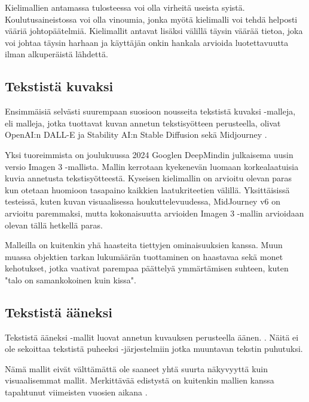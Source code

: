 Kielimallien antamassa tulosteessa voi olla virheitä useista syistä.
Koulutusaineistossa voi olla vinoumia, jonka myötä kielimalli voi tehdä
helposti vääriä johtopäätelmiä. Kielimallit antavat lisäksi välillä täysin
väärää tietoa, joka voi johtaa täysin harhaan ja käyttäjän onkin hankala
arvioida luotettavuutta ilman alkuperäistä lähdettä.
\parencite{akavaworksNakokulmiaTekoalyynOsa6}

\subsection{Tekstistä kuvaksi}

Ensimmäisiä selvästi suurempaan suosioon nousseita tekstistä kuvaksi -malleja,
eli malleja, jotka tuottavat kuvan annetun tekstisyötteen perusteella, olivat
OpenAI:n DALL-E \parencite{openAIDallE} ja Stability AI:n Stable Diffusion
\parencite{stableDiffusionLaunch} sekä Midjourney
\parencite{twitter1547108864788553729}.

Yksi tuoreimmista on joulukuussa 2024 Googlen DeepMindin julkaisema uusin
versio Imagen 3 -mallista. Mallin kerrotaan kyekenevän luomaan korkealaatuisia
kuvia annetusta tekstisyötteestä. Kyseisen kielimallin on arvioitu olevan paras
kun otetaan huomioon tasapaino kaikkien laatukriteetien välillä. Yksittäisissä
testeissä, kuten kuvan visuaalisessa houkuttelevuudessa, MidJourney v6 on
arvioitu paremmaksi, mutta kokonaisuutta arvioiden Imagen 3 -mallin arvioidaan
olevan tällä hetkellä paras. \parencite{googleDeepmindImagen3_v3report}

Malleilla on kuitenkin yhä haasteita tiettyjen ominaisuuksien kanssa. Muun
muassa objektien tarkan lukumäärän tuottaminen on haastavaa sekä monet
kehotukset, jotka vaativat parempaa päättelyä ymmärtämisen suhteen, kuten
"talo on samankokoinen kuin kissa". \parencite{googleDeepmindImagen3_v3report}

\subsection{Tekstistä ääneksi}

Tekstistä ääneksi -mallit luovat annetun kuvauksen perusteella äänen.
\parencite{liu2023audioldmtexttoaudiogenerationlatent}. Näitä ei ole sekoittaa
tekstistä puheeksi -järjestelmiin jotka muuntavan tekstin puhutuksi.

Nämä mallit eivät välttämättä ole saaneet yhtä suurta näkyvyyttä kuin
visuaalisemmat mallit. Merkittävää edistystä on kuitenkin mallien kanssa
tapahtunut viimeisten vuosien aikana
\parencite{liu2023audioldmtexttoaudiogenerationlatent}.

